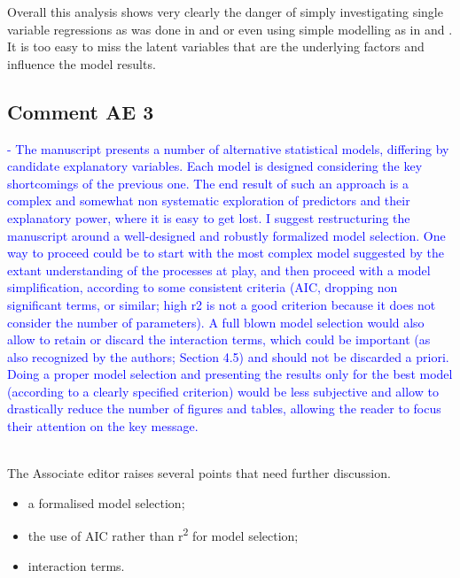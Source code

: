 \documentclass[]{elsarticle} %
\providecommand{\tightlist}{%
  \setlength{\itemsep}{0pt}\setlength{\parskip}{0pt}}
\begin{document}
Overall this analysis shows very clearly the danger of simply investigating single variable regressions as was done in \citet{zhang2017} and \citet{filoso2017} or even using simple modelling as in \citet{jackson2005} and \citet{zhou2015}. It is too easy to miss the latent variables that are the underlying factors and influence the model results.

\hypertarget{comment-ae-3}{%
\subsection{Comment AE 3}\label{comment-ae-3}}

\textcolor{blue}{- The manuscript presents a number of alternative statistical models, differing by candidate explanatory variables. Each model is designed considering the key shortcomings of the previous one. The end result of such an approach is a complex and somewhat non systematic exploration of predictors and their explanatory power, where it is easy to get lost. I suggest restructuring the manuscript around a well-designed and robustly formalized model selection. One way to proceed could be to start with the most complex model suggested by the extant understanding of the processes at play, and then proceed with a model simplification, according to some consistent criteria (AIC, dropping non significant terms, or similar; high r2 is not a good criterion because it does not consider the number of parameters). A full blown model selection would also allow to retain or discard the interaction terms, which could be important (as also recognized by the authors; Section 4.5) and should not be discarded a priori. Doing a proper model selection and presenting the results only for the best model (according to a clearly specified criterion) would be less subjective and allow to drastically reduce the number of figures and tables, allowing the reader to focus their attention on the key message.}\\
\strut \\
The Associate editor raises several points that need further discussion.

\begin{itemize}
\tightlist
\item
  a formalised model selection;\\
\item
  the use of AIC rather than r\textsuperscript{2} for model selection;\\
\item
  interaction terms.
\end{itemize}
\end{document}
